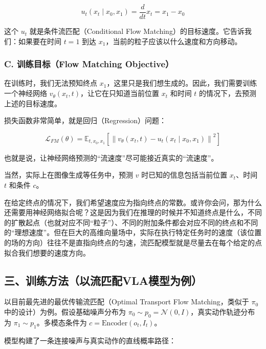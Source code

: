 \[
u_t(x_t\mid x_0,x_1)=\frac{d}{dt}x_t=x_1-x_0
\]

这个 \(u_t\) 就是条件流匹配（Conditional Flow Matching）的目标速度。它告诉我们：如果要在时间 \(t=1\) 到达 \(x_1\)，当前的粒子应该以什么速度和方向移动。

\hypertarget{c.-ux8badux7ec3ux76eeux6807flow-matching-objective}{%
\subsubsection{C. 训练目标（Flow Matching Objective）}\label{c.-ux8badux7ec3ux76eeux6807flow-matching-objective}}

在训练时，我们无法预知终点 \(x_1\)，这里只是我们想生成的。因此，我们需要训练一个神经网络 \(v_\theta(x_t,t)\)，让它在只知道当前位置 \(x_t\) 和时间 \(t\) 的情况下，去预测上述的目标速度。

损失函数非常简单，就是回归（Regression）问题：

\[
\mathcal{L}_{FM}(\theta)=\mathbb{E}_{t,x_0,x_1}\left[\left\|v_\theta(x_t,t)-u_t(x_t\mid x_0,x_1)\right\|^2\right]
\]

也就是说，让神经网络预测的``流速度''尽可能接近真实的``流速度''。

当然，实际上在图像生成等任务中，预测 \(v\) 时已知的信息包括当前位置 \(x_t\)、时间 \(t\) 和条件 \(c\)。

在给定终点的情况下，我们希望速度应为指向终点的常数。或许你会问，那为什么还需要用神经网络拟合呢？这是因为我们在推理的时候并不知道终点是什么，不同的扩散起点（也就对应不同``粒子''）、不同的附加条件都会对应不同的终点和不同的``理想速度''。但在巨大的高维向量场中，实际在执行特定任务时的速度（该位置的场的方向）往往不是直指向终点的匀速，流匹配模型就是尽量去在每个给定的点拟合我们想要的速度方向。

\hypertarget{ux4e09ux8badux7ec3ux65b9ux6cd5ux4ee5ux6d41ux5339ux914dvlaux6a21ux578bux4e3aux4f8b}{%
\subsection{三、训练方法（以流匹配VLA模型为例）}\label{ux4e09ux8badux7ec3ux65b9ux6cd5ux4ee5ux6d41ux5339ux914dvlaux6a21ux578bux4e3aux4f8b}}

以目前最先进的最优传输流匹配（Optimal Transport Flow Matching，类似于 \(\pi_0\) 中的设计）为例。假设基础噪声分布为 \(\pi_0\sim p_0=\mathcal{N}(0,I)\)，真实动作轨迹分布为 \(\pi_1\sim p_1\)。多模态条件为 \(c=\mathrm{Encoder}(o_t,I_t)\)。

模型构建了一条连接噪声与真实动作的直线概率路径：

